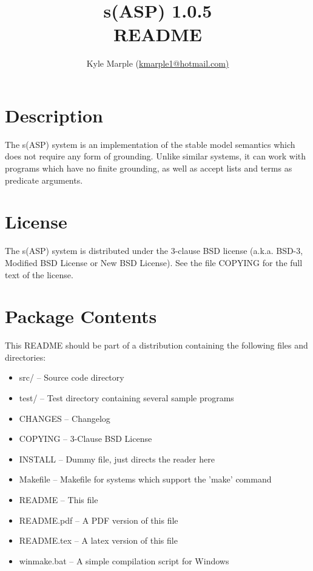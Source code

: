\documentclass[]{article}
\title{s(ASP) 1.0.5\\README}
\author{Kyle Marple (\url{kmarple1@hotmail.com)}}
\begin{document}
\maketitle


\tableofcontents


\section{Description}

The s(ASP) system is an implementation of the stable model semantics which does
not require any form of grounding. Unlike similar systems, it can work with
programs which have no finite grounding, as well as accept lists and terms as
predicate arguments.


\section{License}

The s(ASP) system is distributed under the 3-clause BSD license (a.k.a. BSD-3,
Modified BSD License or New BSD License). See the file COPYING for the full text
of the license.


\section{Package Contents}

This README should be part of a distribution containing the following files and
directories:

\begin{itemize}
	\item src/ -- Source code directory
	\item test/ -- Test directory containing several sample programs
	\item CHANGES -- Changelog
	\item COPYING -- 3-Clause BSD License
	\item INSTALL -- Dummy file, just directs the reader here
	\item Makefile -- Makefile for systems which support the 'make' command
	\item README -- This file
	\item README.pdf -- A PDF version of this file
	\item README.tex -- A latex version of this file
	\item winmake.bat -- A simple compilation script for Windows
\end{itemize}
\end{document}
